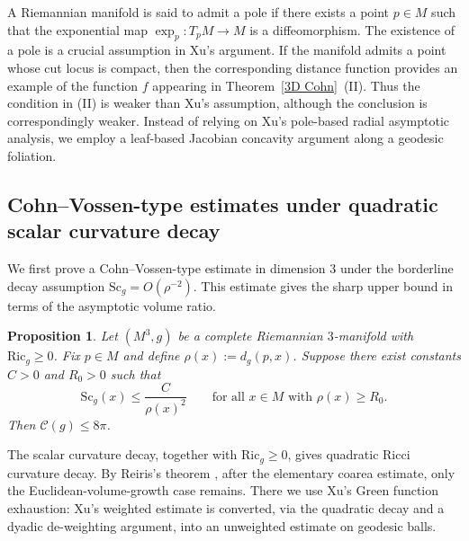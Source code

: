 \documentclass[12pt,oneside,a4paper]{article}
\newtheorem{proposition}[definition]{Proposition}
\theoremstyle{mytheorem}
\theoremstyle{remark}
\begin{document}
A Riemannian manifold is said to admit a pole if there exists a point \(p\in M\) such that the exponential map \(\exp_p:T_pM\to M\) is a diffeomorphism. The existence of a pole is a crucial assumption in Xu's argument. If the manifold admits a point whose cut locus is compact, then the corresponding distance function provides an example of the function \(f\) appearing in Theorem~\ref{3D Cohn}~(II). Thus the condition in (II) is weaker than Xu's assumption, although the conclusion is correspondingly weaker. Instead of relying on Xu’s pole-based radial asymptotic analysis, we employ a leaf-based Jacobian concavity argument along a geodesic foliation. 


\subsection{Cohn--Vossen-type estimates under quadratic scalar curvature decay}

We first prove a Cohn--Vossen-type estimate in dimension $3$ under the
borderline decay assumption $\mathrm{Sc}_g=O(\rho^{-2})$. This estimate gives
the sharp upper bound in terms of the asymptotic volume ratio.

\begin{proposition}\label{avr}
Let \((M^3,g)\) be a complete Riemannian \(3\)-manifold with \(\mathrm{Ric}_g \ge 0\). Fix \(p \in M\) and define \(\rho(x) := d_g(p,x)\). Suppose there exist constants \(C>0\) and \(R_0>0\) such that
\[
\mathrm{Sc}_g(x) \le \frac{C}{\rho(x)^2}
\qquad \text{for all } x \in M \text{ with } \rho(x) \ge R_0.
\]
Then  \(\mathcal{C}(g) \le 8\pi \).

\end{proposition}

The scalar curvature decay, together with $\mathrm{Ric}_g\ge0$, gives quadratic
Ricci curvature decay. By Reiris's theorem \cite[Corollary~1.1]{zbMATH06423474}, after the elementary coarea estimate, only the Euclidean-volume-growth case remains. There we use Xu's Green function exhaustion: Xu's  weighted estimate \cite{zbMATH07177335} is converted, via the quadratic decay and a dyadic de-weighting argument, into an unweighted estimate on geodesic balls.
\end{document}
